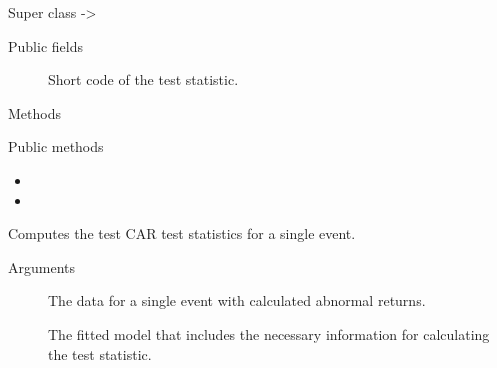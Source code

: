 \documentclass[a4paper]{book}
\begin{document}
%
\begin{Section}{Super class}
 -> 
\end{Section}
%
\begin{Section}{Public fields}

\begin{description}

\item[] Short code of the test statistic.

\end{description}


\end{Section}
%
\begin{Section}{Methods}
%
\begin{SubSection}{Public methods}
\begin{itemize}

\item{} 
\item{} 

\end{itemize}

\end{SubSection}




\hypertarget{method-CARTTest-compute}{}
%
\begin{SubSection}{}
Computes the test CAR test statistics for a single event.
%

%
\begin{SubSubSection}{Arguments}

\begin{description}

\item[] The data for a single event with
calculated abnormal returns.
\item[] The fitted model that includes the
necessary information for calculating the test
statistic.

\end{description}




\end{SubSubSection}
\end{SubSection}
\end{Section}
\end{document}
